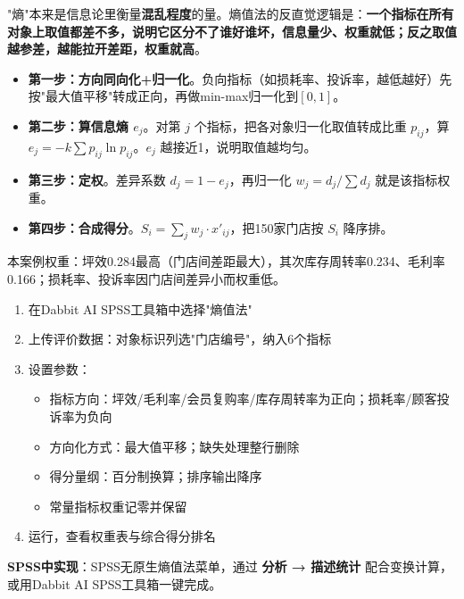 \begin{algoprinciple}
"熵"本来是信息论里衡量\textbf{混乱程度}的量。熵值法的反直觉逻辑是：\textbf{一个指标在所有对象上取值都差不多，说明它区分不了谁好谁坏，信息量少、权重就低；反之取值越参差，越能拉开差距，权重就高}。

\begin{itemize}
    \item \textbf{第一步：方向同向化+归一化}。负向指标（如损耗率、投诉率，越低越好）先按"最大值平移"转成正向，再做min-max归一化到$[0,1]$。
    \item \textbf{第二步：算信息熵 $e_j$}。对第 $j$ 个指标，把各对象归一化取值转成比重 $p_{ij}$，算 $e_j=-k\sum p_{ij}\ln p_{ij}$。$e_j$ 越接近1，说明取值越均匀。
    \item \textbf{第三步：定权}。差异系数 $d_j=1-e_j$，再归一化 $w_j=d_j/\sum d_j$ 就是该指标权重。
    \item \textbf{第四步：合成得分}。$S_i=\sum_j w_j\cdot x'_{ij}$，把150家门店按 $S_i$ 降序排。
\end{itemize}

本案例权重：坪效0.284最高（门店间差距最大），其次库存周转率0.234、毛利率0.166；损耗率、投诉率因门店间差异小而权重低。
\end{algoprinciple}

\begin{algosposs}
\begin{enumerate}
    \item 在Dabbit AI SPSS工具箱中选择"熵值法"
    \item 上传评价数据：对象标识列选"门店编号"，纳入6个指标
    \item 设置参数：
    \begin{itemize}
        \item 指标方向：坪效/毛利率/会员复购率/库存周转率为正向；损耗率/顾客投诉率为负向
        \item 方向化方式：最大值平移；缺失处理整行删除
        \item 得分量纲：百分制换算；排序输出降序
        \item 常量指标权重记零并保留
    \end{itemize}
    \item 运行，查看权重表与综合得分排名
\end{enumerate}

\textbf{SPSS中实现}：SPSS无原生熵值法菜单，通过 \textbf{分析 → 描述统计} 配合变换计算，或用Dabbit AI SPSS工具箱一键完成。
\end{algosposs}

